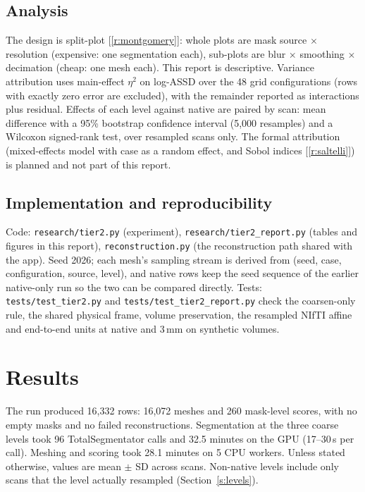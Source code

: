 \documentclass[10pt,a4paper]{article}
\newcommand{\rf}[1]{[\ref{#1}]}
\begin{document}
\subsection{Analysis}
The design is split-plot \rf{r:montgomery}: whole plots are mask source $\times$ resolution (expensive: one segmentation each), sub-plots are blur $\times$ smoothing $\times$ decimation (cheap: one mesh each). This report is descriptive. Variance attribution uses main-effect $\eta^2$ on log-ASSD over the 48 grid configurations (rows with exactly zero error are excluded), with the remainder reported as interactions plus residual. Effects of each level against native are paired by scan: mean difference with a 95\% bootstrap confidence interval (5{,}000 resamples) and a Wilcoxon signed-rank test, over resampled scans only. The formal attribution (mixed-effects model with case as a random effect, and Sobol indices \rf{r:saltelli}) is planned and not part of this report.

\subsection{Implementation and reproducibility}
Code: \texttt{research/tier2.py} (experiment), \texttt{research/tier2\_report.py} (tables and figures in this report), \texttt{reconstruction.py} (the reconstruction path shared with the app). Seed 2026; each mesh's sampling stream is derived from (seed, case, configuration, source, level), and native rows keep the seed sequence of the earlier native-only run so the two can be compared directly. Tests: \texttt{tests/test\_tier2.py} and \texttt{tests/test\_tier2\_report.py} check the coarsen-only rule, the shared physical frame, volume preservation, the resampled NIfTI affine and end-to-end units at native and 3\,mm on synthetic volumes.

\section{Results}

The run produced 16{,}332 rows: 16{,}072 meshes and 260 mask-level scores, with no empty masks and no failed reconstructions. Segmentation at the three coarse levels took 96 TotalSegmentator calls and 32.5 minutes on the GPU (17--30\,s per call). Meshing and scoring took 28.1 minutes on 5 CPU workers. Unless stated otherwise, values are mean $\pm$ SD across scans. Non-native levels include only scans that the level actually resampled (Section~\ref{s:levels}).
\end{document}
